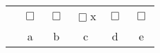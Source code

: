 \begin{center}
\begin{tabular}{c c c c c c}
& $\Box$ & $\Box$  & $\Box$\hspace{-0.25cm}x    & $\Box$   & $\Box$  \\
& a & b  & c  & d  & e \\
\end{tabular}
\end{center}

